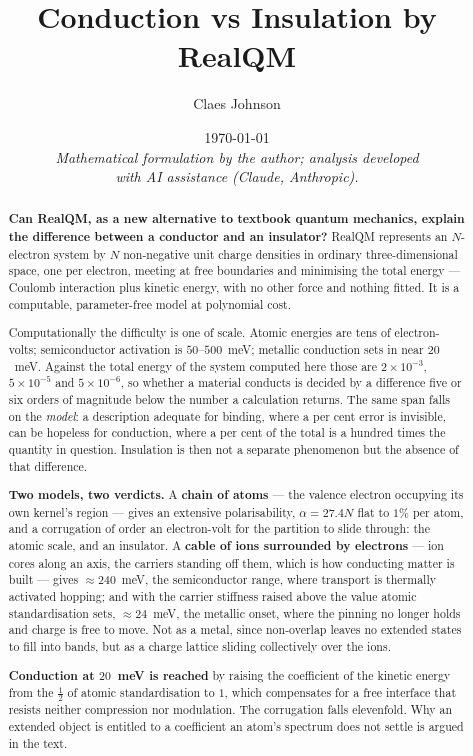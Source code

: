 \documentclass[11pt]{article}
\title{Conduction vs Insulation by RealQM}
\author[1]{Claes Johnson}
\affil[1]{KTH Royal Institute of Technology, SE-100 44 Stockholm, Sweden \\
\texttt{claesjohnson@gmail.com}}
\date{\today \\[0.4em]
\small\textit{Mathematical formulation by the author; analysis developed} \\
\small\textit{with AI assistance (Claude, Anthropic).}}
\begin{document}
\maketitle

\begin{abstract}
\noindent \textbf{Can RealQM, as a new alternative to textbook quantum mechanics, explain the
difference between a conductor and an insulator?} RealQM represents an $N$-electron system by $N$
non-negative unit charge densities in ordinary three-dimensional space, one per electron, meeting at
free boundaries and minimising the total energy --- Coulomb interaction plus kinetic energy, with no
other force and nothing fitted. It is a computable, parameter-free model at polynomial cost.

Computationally the difficulty is one of scale. Atomic energies are tens of electron-volts;
semiconductor activation is $50$--$500$~meV; metallic conduction sets in near $20$~meV. Against the
total energy of the system computed here those are $2\times10^{-3}$, $5\times10^{-5}$ and
$5\times10^{-6}$, so whether a material conducts is decided by a difference five or six orders of
magnitude below the number a calculation returns. The same span falls on the \emph{model}: a
description adequate for binding, where a per cent error is invisible, can be hopeless for
conduction, where a per cent of the total is a hundred times the quantity in question. Insulation is
then not a separate phenomenon but the absence of that difference.

\textbf{Two models, two verdicts.} A \textbf{chain of atoms} --- the valence electron occupying its own
kernel's region --- gives an extensive polarisability, $\alpha=27.4N$ flat to $1\%$ per atom, and a
corrugation of order an electron-volt for the partition to slide through: the atomic scale, and an
insulator. A \textbf{cable of ions surrounded by electrons} --- ion cores along an axis, the carriers standing off
them, which is how conducting matter is built --- gives ${\approx}240$~meV, the semiconductor range,
where transport is thermally activated hopping; and with the carrier stiffness raised above the value
atomic standardisation sets, ${\approx}24$~meV, the metallic onset, where the pinning no longer holds and
charge is free to move. Not as a metal, since non-overlap leaves no extended states to fill into
bands, but as a charge lattice sliding collectively over the ions.

\textbf{Conduction at $20$~meV is reached} by raising the coefficient of the kinetic energy from
the $\tfrac12$ of atomic standardisation to $1$, which
compensates for a free interface that resists neither compression nor modulation. The corrugation
falls elevenfold. Why an extended object is entitled to a coefficient an atom's spectrum does not settle
is argued in the text.


\end{abstract}
\end{document}
